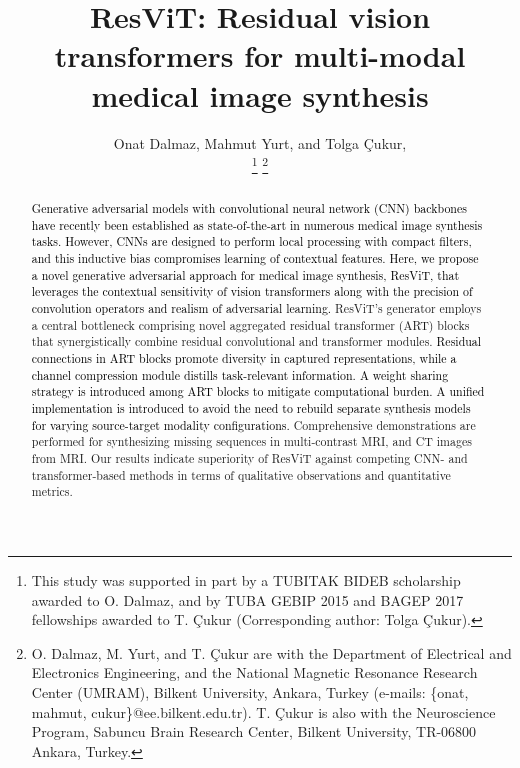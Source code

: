 \documentclass[journal,twoside,web]{ieeecolor}
\newcommand*{\revhl}{\textcolor{black}}
\begin{document}
\title{ResViT: Residual vision transformers for multi-modal medical image synthesis}
\author{Onat Dalmaz, Mahmut Yurt, and Tolga \c{C}ukur,  \vspace{-1.5cm}
\\
\thanks{This study was supported in part by a TUBITAK BIDEB scholarship awarded to O. Dalmaz, and by TUBA GEBIP 2015 and BAGEP 2017 fellowships awarded to T. \c{C}ukur  (Corresponding author: Tolga \c{C}ukur).}
\thanks{O. Dalmaz, M. Yurt, and T. \c{C}ukur are with the Department of Electrical and Electronics Engineering, and the National Magnetic Resonance Research Center (UMRAM), Bilkent University, Ankara, Turkey (e-mails: \{onat, mahmut, cukur\}@ee.bilkent.edu.tr). T. Çukur is also with the Neuroscience Program, Sabuncu Brain Research Center, Bilkent University, TR-06800 Ankara, Turkey.}
}

\maketitle
\begin{abstract}
\revhl{Generative adversarial models with convolutional neural network (CNN) backbones have recently been established as state-of-the-art in numerous medical image synthesis tasks. However, CNNs are designed to perform local processing with compact filters, and this inductive bias compromises learning of contextual features. Here, we propose a novel generative adversarial approach for medical image synthesis, ResViT, that leverages the contextual sensitivity of vision transformers along with the precision of convolution operators and realism of adversarial learning.} ResViT's generator employs a central bottleneck comprising novel aggregated residual transformer (ART) blocks that synergistically combine residual convolutional and transformer modules. \revhl{Residual connections in ART blocks promote diversity in captured representations, while a channel compression module distills task-relevant information. A weight sharing strategy is introduced among ART blocks to mitigate computational burden. A unified implementation is introduced to avoid the need to rebuild separate synthesis models for varying source-target modality configurations.} Comprehensive demonstrations are performed for synthesizing missing sequences in multi-contrast MRI, and CT images from MRI. Our results indicate superiority of ResViT against competing CNN- and transformer-based methods in terms of qualitative observations and quantitative metrics.
\end{abstract}
\end{document}

